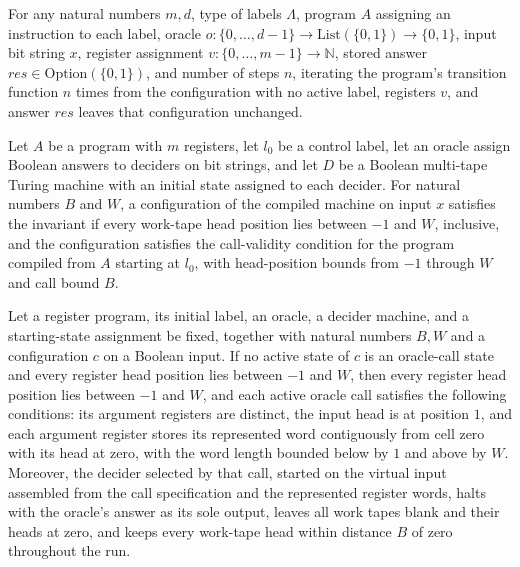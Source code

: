\begin{lemma}
\label{Complexity.LogProg.arun_halted}
\leanok
{}
For any natural numbers $m,d$, type of labels $\Lambda$, program $A$ assigning an
instruction to each label, oracle $o : \{0,\ldots,d-1\} \to \mathrm{List}(\{0,1\}) \to
\{0,1\}$, input bit string $x$, register assignment $v : \{0,\ldots,m-1\} \to
\mathbb{N}$, stored answer $res \in \mathrm{Option}(\{0,1\})$, and number of steps $n$,
iterating the program’s transition function $n$ times from the configuration with no
active label, registers $v$, and answer $res$ leaves that configuration unchanged.
\end{lemma}

\begin{definition}
\label{Complexity.LogProg.Inv}
\leanok
{}
Let $A$ be a program with $m$ registers, let $l_0$ be a control label, let an oracle
assign Boolean answers to deciders on bit strings, and let $D$ be a Boolean multi-tape
Turing machine with an initial state assigned to each decider. For natural numbers $B$
and $W$, a configuration of the compiled machine on input $x$ satisfies the invariant if
every work-tape head position lies between $-1$ and $W$, inclusive, and the
configuration satisfies the call-validity condition for the program compiled from $A$
starting at $l_0$, with head-position bounds from $-1$ through $W$ and call bound $B$.
\end{definition}

\begin{lemma}
\label{Complexity.LogProg.inv_of_mid}
\leanok
{}
Let a register program, its initial label, an oracle, a decider machine, and a
starting-state assignment be fixed, together with natural numbers $B,W$ and a
configuration $c$ on a Boolean input. If no active state of $c$ is an oracle-call state
and every register head position lies between $-1$ and $W$, then every register head
position lies between $-1$ and $W$, and each active oracle call satisfies the following
conditions: its argument registers are distinct, the input head is at position $1$, and
each argument register stores its represented word contiguously from cell zero with its
head at zero, with the word length bounded below by $1$ and above by $W$. Moreover, the
decider selected by that call, started on the virtual input assembled from the call
specification and the represented register words, halts with the oracle's answer as its
sole output, leaves all work tapes blank and their heads at zero, and keeps every
work-tape head within distance $B$ of zero throughout the run.
\end{lemma}

